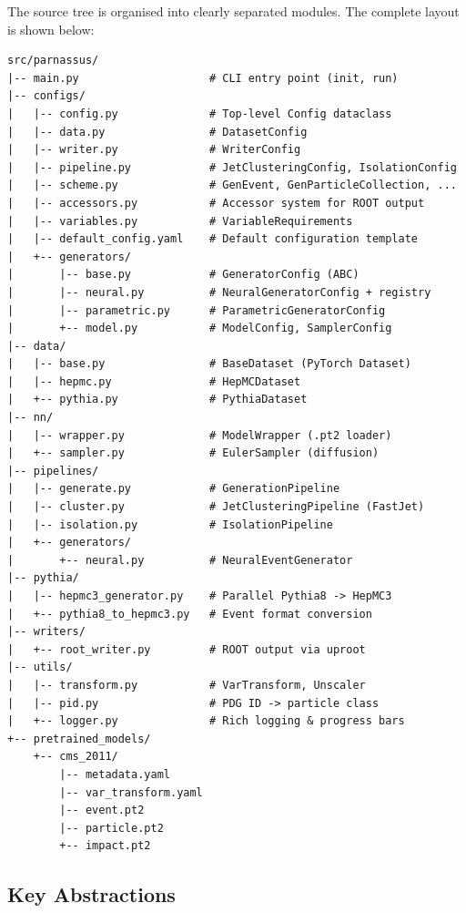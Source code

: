 \documentclass[11pt,a4paper]{article}
\begin{document}
The source tree is organised into clearly separated modules. The complete layout is shown
below:

\begin{lstlisting}[style=bash,caption={Source tree layout.},label=lst:tree]
src/parnassus/
|-- main.py                    # CLI entry point (init, run)
|-- configs/
|   |-- config.py              # Top-level Config dataclass
|   |-- data.py                # DatasetConfig
|   |-- writer.py              # WriterConfig
|   |-- pipeline.py            # JetClusteringConfig, IsolationConfig
|   |-- scheme.py              # GenEvent, GenParticleCollection, ...
|   |-- accessors.py           # Accessor system for ROOT output
|   |-- variables.py           # VariableRequirements
|   |-- default_config.yaml    # Default configuration template
|   +-- generators/
|       |-- base.py            # GeneratorConfig (ABC)
|       |-- neural.py          # NeuralGeneratorConfig + registry
|       |-- parametric.py      # ParametricGeneratorConfig
|       +-- model.py           # ModelConfig, SamplerConfig
|-- data/
|   |-- base.py                # BaseDataset (PyTorch Dataset)
|   |-- hepmc.py               # HepMCDataset
|   +-- pythia.py              # PythiaDataset
|-- nn/
|   |-- wrapper.py             # ModelWrapper (.pt2 loader)
|   +-- sampler.py             # EulerSampler (diffusion)
|-- pipelines/
|   |-- generate.py            # GenerationPipeline
|   |-- cluster.py             # JetClusteringPipeline (FastJet)
|   |-- isolation.py           # IsolationPipeline
|   +-- generators/
|       +-- neural.py          # NeuralEventGenerator
|-- pythia/
|   |-- hepmc3_generator.py    # Parallel Pythia8 -> HepMC3
|   +-- pythia8_to_hepmc3.py   # Event format conversion
|-- writers/
|   +-- root_writer.py         # ROOT output via uproot
|-- utils/
|   |-- transform.py           # VarTransform, Unscaler
|   |-- pid.py                 # PDG ID -> particle class
|   +-- logger.py              # Rich logging & progress bars
+-- pretrained_models/
    +-- cms_2011/
        |-- metadata.yaml
        |-- var_transform.yaml
        |-- event.pt2
        |-- particle.pt2
        +-- impact.pt2
\end{lstlisting}

\subsection{Key Abstractions}
\end{document}

